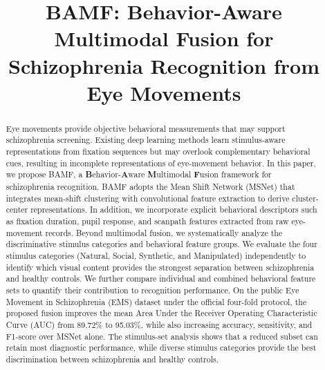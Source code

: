 \documentclass[conference,a4paper]{IEEEtran}
\begin{document}
\title{BAMF: Behavior-Aware Multimodal Fusion for Schizophrenia Recognition from Eye Movements}

\author{
}

\maketitle

\begin{abstract}
Eye movements provide objective behavioral measurements that may support schizophrenia screening. Existing deep learning methods learn stimulus-aware representations from fixation sequences but may overlook complementary behavioral cues, resulting in incomplete representations of eye-movement behavior. In this paper, we propose BAMF, a \textbf{B}ehavior-\textbf{A}ware \textbf{M}ultimodal \textbf{F}usion framework for schizophrenia recognition. BAMF adopts the Mean Shift Network (MSNet) that integrates mean-shift clustering with convolutional feature extraction to derive cluster-center representations. In addition, we incorporate explicit behavioral descriptors such as fixation duration, pupil response, and scanpath features extracted from raw eye-movement records. Beyond multimodal fusion, we systematically analyze the discriminative stimulus categories and behavioral feature groups. We evaluate the four stimulus categories (Natural, Social, Synthetic, and Manipulated) independently to identify which visual content provides the strongest separation between schizophrenia and healthy controls. We further compare individual and combined behavioral feature sets to quantify their contribution to recognition performance. On the public Eye Movement in Schizophrenia (EMS) dataset under the official four-fold protocol, the proposed fusion improves the mean Area Under the Receiver Operating Characteristic Curve (AUC) from 89.72\% to 95.03\%, while also increasing accuracy, sensitivity, and F1-score over MSNet alone. The stimulus-set analysis shows that a reduced subset can retain most diagnostic performance, while diverse stimulus categories provide the best discrimination between schizophrenia and healthy controls.

\end{abstract}
\end{document}
